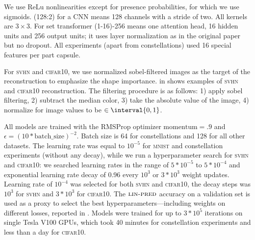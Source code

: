 We use ReLu nonlinearities except for presence probabilities, for which we use sigmoids.
(128:2) for a \gls{CNN} means 128 channels with a stride of two.
All kernels are $3\times3$.
For set transformer (1-16)-256 means one attention head, 16 hidden units and 256 output units; it uses layer normalization \citep{Ba2016layern} as in the original paper \citep{Lee2019set} but no dropout. All experiments (apart from constellations) used 16 special features per part capsule.

For \textsc{svhn} and \textsc{cifar10}, we use normalized sobel-filtered images as the target of the reconstruction to emphasize the shape importance.  in  shows examples of \textsc{svhn} and \textsc{cifar10} reconstruction.
The filtering procedure is as follows:
1) apply sobel filtering, 2) subtract the median color, 3) take the absolute value of the image, 4) normalize for image values to be $\in \interval{0, 1}$.

All models are trained with the RMSProp optimizer \citep{Tieleman2012rms} $\mathrm{momentum}=.9$ and $\epsilon = \left(10 * \mathrm{batch\_size}\right)^{-2}$.
Batch size is 64 for constellations and 128 for all other datasets.
The learning rate was equal to $10^{-5}$ for \textsc{mnist} and constellation experiments (without any decay), while we run a hyperparameter search for \textsc{svhn} and \textsc{cifar10}: we searched learning rates in the range of $5*10^{-5}$ to $5*10^{-4}$ and exponential learning rate decay of 0.96 every $10^3$ or $3*10^3$ weight updates. Learning rate of $10^{-4}$ was selected for both \textsc{svhn} and \textsc{cifar10}, the decay steps was $10^3$ for \textsc{svhn} and $3*10^3$ for \textsc{cifar10}.
The $\textsc{lin-pred}$ accuracy on a validation set is used as a proxy to select the best hyperparameters---including weights on different losses, reported in .
Models were trained for up to $3*10^5$ iterations on single Tesla V100 GPUs, which took 40 minutes for constellation experiments and less than a day for \textsc{cifar10}.

